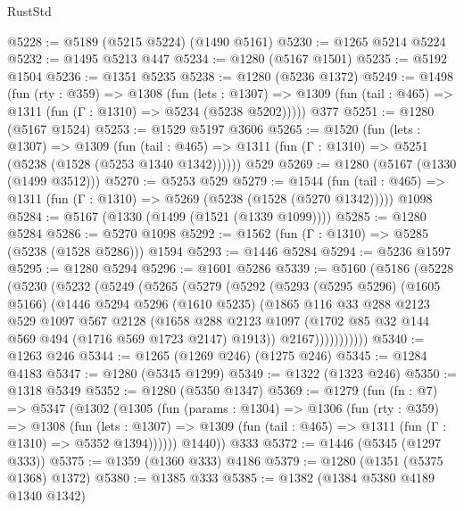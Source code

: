 \begin{lexlean}{RustStd}
\begin{coremodule}
{\begin{coremodule}
{{{{{{{{{{{{@5228 := @5189 (@5215 @5224) (@1490 @5161)
@5230 := @1265 @5214 @5224
@5232 := @1495 @5213 @447
@5234 := @1280 (@5167 @1501)
@5235 := @5192 @1504
@5236 := @1351 @5235
@5238 := @1280 (@5236 @1372)
@5249 := @1498
    (fun (rty : @359) =>
    @1308
      (fun (lets : @1307) =>
      @1309 (fun (tail : @465) => @1311 (fun (Γ : @1310) => @5234 (@5238 @5202)))))
    @377
@5251 := @1280 (@5167 @1524)
@5253 := @1529 @5197 @3606
@5265 := @1520
    (fun (lets : @1307) =>
    @1309
      (fun (tail : @465) => @1311 (fun (Γ : @1310) => @5251 (@5238 (@1528 (@5253 @1340 @1342))))))
    @529
@5269 := @1280 (@5167 (@1330 (@1499 @3512)))
@5270 := @5253 @529
@5279 := @1544
    (fun (tail : @465) => @1311 (fun (Γ : @1310) => @5269 (@5238 (@1528 (@5270 @1342)))))
    @1098
@5284 := @5167 (@1330 (@1499 (@1521 (@1339 @1099))))
@5285 := @1280 @5284
@5286 := @5270 @1098
@5292 := @1562 (fun (Γ : @1310) => @5285 (@5238 (@1528 @5286))) @1594
@5293 := @1446 @5284
@5294 := @5236 @1597
@5295 := @1280 @5294
@5296 := @1601 @5286
@5339 := @5160
    (@5186
      (@5228
        (@5230
          (@5232
            (@5249
              (@5265
                (@5279
                  (@5292
                    (@5293
                      (@5295 @5296)
                      (@1605 @5166)
                      (@1446
                        @5294
                        @5296
                        (@1610 @5235)
                        (@1865
                          @116
                          @33
                          @288
                          @2123
                          @529
                          @1097
                          @567
                          @2128
                          (@1658
                            @288
                            @2123
                            @1097
                            (@1702 @85 @32 @144 @569 @494 (@1716 @569 @1723 @2147) @1913))
                          @2167)))))))))))
@5340 := @1263 @246
@5344 := @1265 (@1269 @246) (@1275 @246)
@5345 := @1284 @4183
@5347 := @1280 (@5345 @1299)
@5349 := @1322 (@1323 @246)
@5350 := @1318 @5349
@5352 := @1280 (@5350 @1347)
@5369 := @1279
    (fun (fn : @7) =>
    @5347
      (@1302
        (@1305
          (fun (params : @1304) =>
          @1306
            (fun (rty : @359) =>
            @1308
              (fun (lets : @1307) =>
              @1309 (fun (tail : @465) => @1311 (fun (Γ : @1310) => @5352 @1394))))))
        @1440))
    @333
@5372 := @1446 (@5345 (@1297 @333))
@5375 := @1359 (@1360 @333) @4186
@5379 := @1280 (@1351 (@5375 @1368) @1372)
@5380 := @1385 @333
@5385 := @1382 (@1384 @5380 @4189 @1340 @1342)
}}}}}}}}}}}}
\end{coremodule}}
\end{coremodule}
\end{lexlean}
